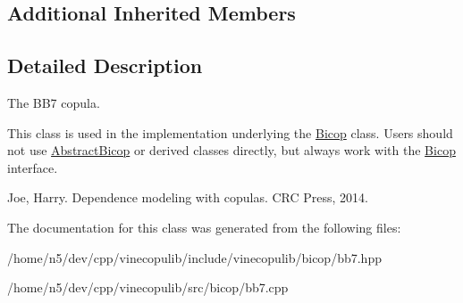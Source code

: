 \subsection*{Additional Inherited Members}


\subsection{Detailed Description}
The B\+B7 copula. 

This class is used in the implementation underlying the \hyperlink{classvinecopulib_1_1_bicop}{Bicop} class. Users should not use \hyperlink{classvinecopulib_1_1_abstract_bicop}{Abstract\+Bicop} or derived classes directly, but always work with the \hyperlink{classvinecopulib_1_1_bicop}{Bicop} interface.

Joe, Harry. Dependence modeling with copulas. C\+RC Press, 2014. 

The documentation for this class was generated from the following files\+:\begin{DoxyCompactItemize}
\item 
/home/n5/dev/cpp/vinecopulib/include/vinecopulib/bicop/bb7.\+hpp\item 
/home/n5/dev/cpp/vinecopulib/src/bicop/bb7.\+cpp\end{DoxyCompactItemize}
